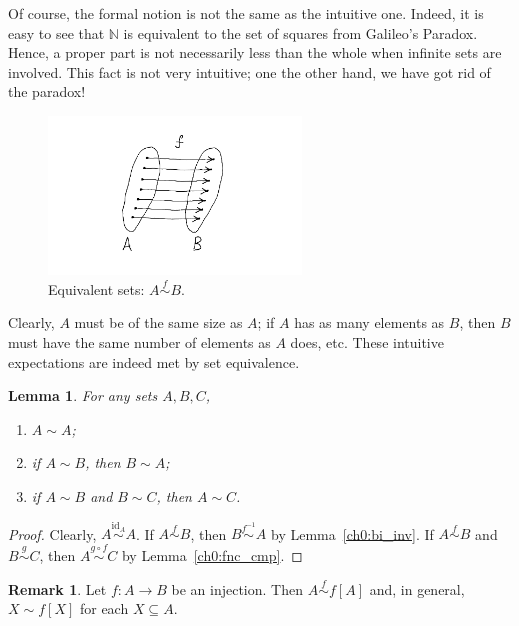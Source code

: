 \documentclass[12pt,notitlepage]{article}
\theoremstyle{plain}
\newtheorem{lemma}[thm]{Lemma}
\theoremstyle{definition}
\newtheorem{rem}[thm]{Remark}
\theoremstyle{plain}
\newcommand{\N}{\mathbb{N}}
\newcommand{\sbs}{\subseteq}
\newcommand{\id}{\mathrm{id}}
\newcommand{\1}{\mathbf{1}}
\newcommand{\0}{\mathbf{0}}
\begin{document}
Of course, the formal notion is not the same as the intuitive one. Indeed, it is easy to see that $\N$ is equivalent to the set of squares from Galileo's Paradox. Hence, a proper part is not necessarily less than the whole when infinite sets are involved. This fact is not very intuitive; one the other hand, we have got rid of the paradox!

\begin{figure}[h]
\centering
\includegraphics*[width=0.6\textwidth]{eq_sets.pdf}
\caption{Equivalent sets: $A \stackrel{f}{\sim} B$.}
\end{figure}

Clearly, $A$ must be of the same size as $A$; if $A$ has as many elements as $B$, then $B$ must have the same number of elements as $A$ does, etc. These intuitive expectations are indeed met by set equivalence.
\begin{lemma}\label{ch0:l157} For any sets $A, B, C$,
\begin{enumerate}
\item $A \sim A$;
\item if $A \sim B$, then $B \sim A$;
\item if $A \sim B$ and $B \sim C$, then $A \sim C$.
\end{enumerate}
\end{lemma}
\begin{proof}
Clearly, $A \stackrel{\id_A}{\sim} A$. If $A \stackrel{f}{\sim} B$, then $B \stackrel{f^{-1}}{\sim} A$ by Lemma~\ref{ch0:bi_inv}. If $A \stackrel{f}{\sim} B$ and $B \stackrel{g}{\sim} C$, then $A \stackrel{g \circ f}{\sim} C$ by Lemma~\ref{ch0:fnc_cmp}.
\end{proof}

\begin{rem}\label{ch0:inj_img}
Let $f\colon A \to B$ be an injection. Then $A \stackrel{f}{\sim} f[A]$ and, in general, $X \sim f[X]$ for each $X \sbs A$.
\end{rem}
\end{document}
